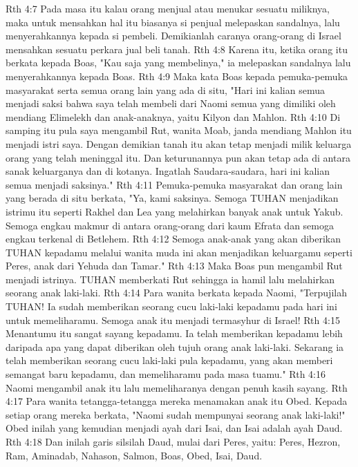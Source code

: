 Rth 4:7  Pada masa itu kalau orang menjual atau menukar sesuatu miliknya, maka untuk mensahkan hal itu biasanya si penjual melepaskan sandalnya, lalu menyerahkannya kepada si pembeli. Demikianlah caranya orang-orang di Israel mensahkan sesuatu perkara jual beli tanah.
Rth 4:8  Karena itu, ketika orang itu berkata kepada Boas, "Kau saja yang membelinya," ia melepaskan sandalnya lalu menyerahkannya kepada Boas.
Rth 4:9  Maka kata Boas kepada pemuka-pemuka masyarakat serta semua orang lain yang ada di situ, "Hari ini kalian semua menjadi saksi bahwa saya telah membeli dari Naomi semua yang dimiliki oleh mendiang Elimelekh dan anak-anaknya, yaitu Kilyon dan Mahlon.
Rth 4:10  Di samping itu pula saya mengambil Rut, wanita Moab, janda mendiang Mahlon itu menjadi istri saya. Dengan demikian tanah itu akan tetap menjadi milik keluarga orang yang telah meninggal itu. Dan keturunannya pun akan tetap ada di antara sanak keluarganya dan di kotanya. Ingatlah Saudara-saudara, hari ini kalian semua menjadi saksinya."
Rth 4:11  Pemuka-pemuka masyarakat dan orang lain yang berada di situ berkata, "Ya, kami saksinya. Semoga TUHAN menjadikan istrimu itu seperti Rakhel dan Lea yang melahirkan banyak anak untuk Yakub. Semoga engkau makmur di antara orang-orang dari kaum Efrata dan semoga engkau terkenal di Betlehem.
Rth 4:12  Semoga anak-anak yang akan diberikan TUHAN kepadamu melalui wanita muda ini akan menjadikan keluargamu seperti Peres, anak dari Yehuda dan Tamar."
Rth 4:13  Maka Boas pun mengambil Rut menjadi istrinya. TUHAN memberkati Rut sehingga ia hamil lalu melahirkan seorang anak laki-laki.
Rth 4:14  Para wanita berkata kepada Naomi, "Terpujilah TUHAN! Ia sudah memberikan seorang cucu laki-laki kepadamu pada hari ini untuk memeliharamu. Semoga anak itu menjadi termasyhur di Israel!
Rth 4:15  Menantumu itu sangat sayang kepadamu. Ia telah memberikan kepadamu lebih daripada apa yang dapat diberikan oleh tujuh orang anak laki-laki. Sekarang ia telah memberikan seorang cucu laki-laki pula kepadamu, yang akan memberi semangat baru kepadamu, dan memeliharamu pada masa tuamu."
Rth 4:16  Naomi mengambil anak itu lalu memeliharanya dengan penuh kasih sayang.
Rth 4:17  Para wanita tetangga-tetangga mereka menamakan anak itu Obed. Kepada setiap orang mereka berkata, "Naomi sudah mempunyai seorang anak laki-laki!" Obed inilah yang kemudian menjadi ayah dari Isai, dan Isai adalah ayah Daud.
Rth 4:18  Dan inilah garis silsilah Daud, mulai dari Peres, yaitu: Peres, Hezron, Ram, Aminadab, Nahason, Salmon, Boas, Obed, Isai, Daud.


